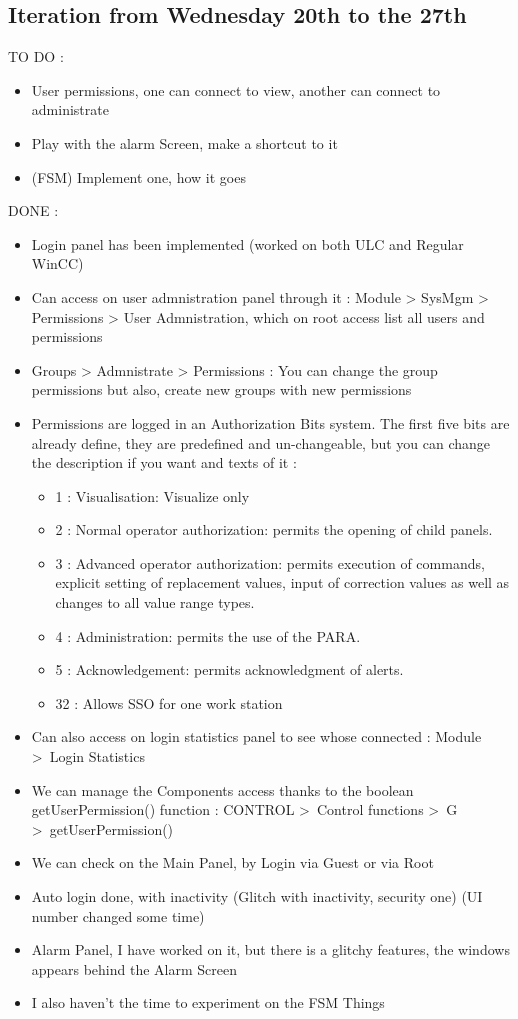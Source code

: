 \documentclass[a4paper, 10pt]{article}
\begin{document}
\subsection{Iteration from Wednesday 20th to the 27th}
TO DO : 
\begin{itemize}
    \item User permissions, one can connect to view, another can connect to administrate
    \item Play with the alarm Screen, make a shortcut to it
    \item (FSM) Implement one, how it goes
\end{itemize}
DONE :  
\begin{itemize}
    \item Login panel has been implemented (worked on both ULC and Regular WinCC)
    \item Can access on user admnistration panel through it : Module > SysMgm > Permissions > User Admnistration, which on root access list all users and permissions
    \item Groups > Admnistrate > Permissions : You can change the group permissions but also, create new groups with new permissions
    \item Permissions are logged in an Authorization Bits system. The first five bits are already define, they are predefined and un-changeable, but you can change the description if you want and texts of it : 
    \begin{itemize}
        \item 1 : Visualisation: Visualize only
        \item 2 : Normal operator authorization: permits the opening of child panels.
        \item 3 : Advanced operator authorization: permits execution of commands, explicit setting of replacement values, input of correction values as well as changes to all value range types.
        \item 4 : Administration: permits the use of the PARA.
        \item 5 : Acknowledgement: permits acknowledgment of alerts.
        \item 32 : Allows SSO for one work station
    \end{itemize}
    \item Can also access on login statistics panel to see whose connected : Module \textgreater\  Login Statistics
    \item We can manage the Components access thanks to the boolean getUserPermission() function : CONTROL \textgreater\  Control functions \textgreater\ G \textgreater\ getUserPermission()
    \item We can check on the Main Panel, by Login via Guest or via Root
    \item Auto login done, with inactivity (Glitch with inactivity, security one) (UI number changed some time)
    \item Alarm Panel, I have worked on it, but there is a glitchy features, the windows appears behind the Alarm Screen
    \item I also haven't the time to experiment on the FSM Things
\end{itemize}
\end{document}
